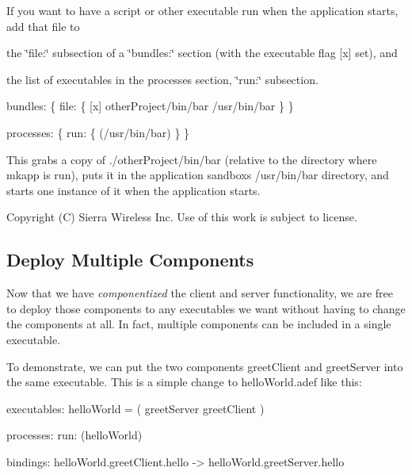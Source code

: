 If you want to have a script or other executable run when the application starts, add that file to
\begin{DoxyItemize}
\item the \char`\"{}file\+:\char`\"{} subsection of a \char`\"{}bundles\+:\char`\"{} section (with the executable flag \mbox{[}x\mbox{]} set), and
\item the list of executables in the processes section, \char`\"{}run\+:\char`\"{} subsection.
\end{DoxyItemize}


\begin{DoxyCode}
bundles:
\{
    file:
    \{
        [x]     otherProject/bin/bar    /usr/bin/bar
    \}
\}

processes:
\{
    run:
    \{
        (/usr/bin/bar)
    \}
\}
\end{DoxyCode}


This grabs a copy of ./other\+Project/bin/bar (relative to the directory where {\ttfamily mkapp} is run), puts it in the application sandbox\textquotesingle{}s /usr/bin/bar directory, and starts one instance of it when the application starts.





Copyright (C) Sierra Wireless Inc. Use of this work is subject to license. \hypertarget{basicAppsCompMulti}{}\subsection{Deploy Multiple Components}\label{basicAppsCompMulti}
Now that we have {\itshape componentized} the client and server functionality, we are free to deploy those components to any executables we want without having to change the components at all. In fact, multiple components can be included in a single executable.

To demonstrate, we can put the two components {\ttfamily greet\+Client} and {\ttfamily greet\+Server} into the same executable. This is a simple change to hello\+World.\+adef like this\+:

\begin{DoxyVerb}executables:
{
    helloWorld = ( greetServer greetClient )
}

processes:
{
    run:
    {
        (helloWorld)
    }
}

bindings:
{
     helloWorld.greetClient.hello -> helloWorld.greetServer.hello
 }
\end{DoxyVerb}






